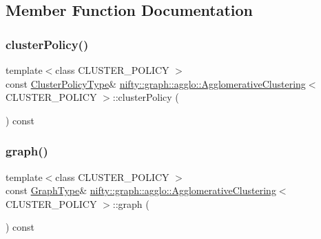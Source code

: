\subsection{Member Function Documentation}
\mbox{\label{classnifty_1_1graph_1_1agglo_1_1AgglomerativeClustering_a5e68685d164d4f6104bd40c29eca0c08}} 
\subsubsection{\texorpdfstring{cluster\+Policy()}{clusterPolicy()}}
{\footnotesize\ttfamily template$<$class C\+L\+U\+S\+T\+E\+R\+\_\+\+P\+O\+L\+I\+CY $>$ \\
const \hyperlink{classnifty_1_1graph_1_1agglo_1_1AgglomerativeClustering_a3a678ecd37725f2c0f8ec56857768034}{Cluster\+Policy\+Type}\& \hyperlink{classnifty_1_1graph_1_1agglo_1_1AgglomerativeClustering}{nifty\+::graph\+::agglo\+::\+Agglomerative\+Clustering}$<$ C\+L\+U\+S\+T\+E\+R\+\_\+\+P\+O\+L\+I\+CY $>$\+::cluster\+Policy (\begin{DoxyParamCaption}{ }\end{DoxyParamCaption}) const\hspace{0.3cm}{\ttfamily [inline]}}

\mbox{\label{classnifty_1_1graph_1_1agglo_1_1AgglomerativeClustering_a4da52a342e866335a671879e8c4864d2}} 
\subsubsection{\texorpdfstring{graph()}{graph()}}
{\footnotesize\ttfamily template$<$class C\+L\+U\+S\+T\+E\+R\+\_\+\+P\+O\+L\+I\+CY $>$ \\
const \hyperlink{classnifty_1_1graph_1_1agglo_1_1AgglomerativeClustering_a0c735105592b55c036be76e3d7fc735f}{Graph\+Type}\& \hyperlink{classnifty_1_1graph_1_1agglo_1_1AgglomerativeClustering}{nifty\+::graph\+::agglo\+::\+Agglomerative\+Clustering}$<$ C\+L\+U\+S\+T\+E\+R\+\_\+\+P\+O\+L\+I\+CY $>$\+::graph (\begin{DoxyParamCaption}{ }\end{DoxyParamCaption}) const\hspace{0.3cm}{\ttfamily [inline]}}

